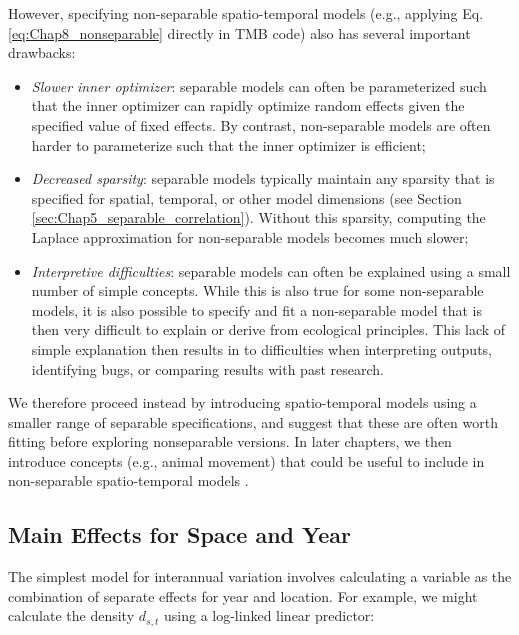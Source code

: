However, specifying non-separable spatio-temporal models (e.g., applying Eq. \ref{eq:Chap8_nonseparable} directly in TMB code) also has several important drawbacks:
\begin{itemize}
    \item \textit{Slower inner optimizer}:  separable models can often be parameterized such that the inner optimizer can rapidly optimize random effects given the specified value of fixed effects.  By contrast, non-separable models are often harder to parameterize such that the inner optimizer is efficient;

    \item \textit{Decreased sparsity}:  separable models typically maintain any sparsity that is specified for spatial, temporal, or other model dimensions (see Section \ref{sec:Chap5_separable_correlation}).  Without this sparsity, computing the Laplace approximation for non-separable models becomes much slower;  

    \item \textit{Interpretive difficulties}:  separable models can often be explained using a small number of simple concepts.  While this is also true for some non-separable models, it is also possible to specify and fit a non-separable model that is then very difficult to explain or derive from ecological principles.  This lack of simple explanation then results in to difficulties when interpreting outputs, identifying bugs, or comparing results with past research.  
\end{itemize}
We therefore proceed instead by introducing spatio-temporal models using a smaller range of separable specifications, and suggest that these are often worth fitting before exploring nonseparable versions.  In later chapters, we then introduce concepts (e.g., animal movement) that could be useful to include in non-separable spatio-temporal models \cite{thorson_estimating_2021}.  

\subsection{Main Effects for Space and Year}

The simplest model for interannual variation involves calculating a variable as the combination of separate effects for year and location.  For example, we might calculate the density \( d_{s,t} \) using a log-linked linear predictor:

